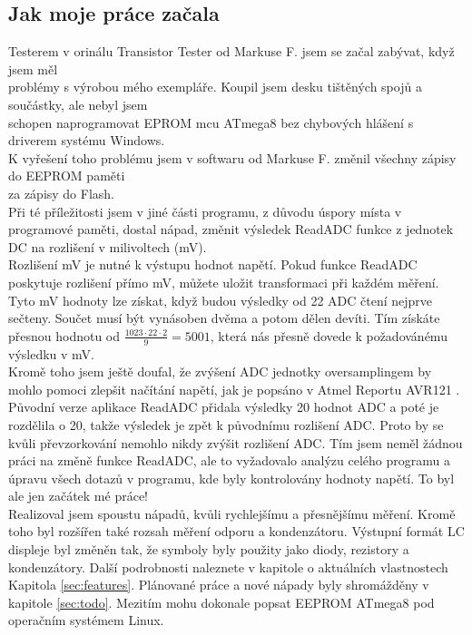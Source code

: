 \subsection*{Jak moje práce začala}
Testerem v orinálu Transistor Tester od Markuse F. \cite{Frejek} jsem se začal zabývat, když jsem měl
\\problémy s výrobou mého exempláře. Koupil jsem desku tištěných spojů a součástky, ale nebyl jsem
\\schopen naprogramovat EPROM mcu ATmega8 bez chybových hlášení s driverem systému Windows.
\\K vyřešení toho problému jsem v softwaru od Markuse F. změnil všechny zápisy do EEPROM paměti
\\za zápisy do Flash.
\\Při té příležitosti jsem v jiné části programu, z důvodu úspory místa v programové paměti, dostal nápad, změnit výsledek ReadADC funkce z jednotek DC  na rozlišení v milivoltech (mV).
\\Rozlišení mV je nutné k výstupu hodnot napětí. Pokud funkce ReadADC poskytuje rozlišení přímo mV, můžete uložit transformaci při každém měření.
Tyto mV hodnoty lze získat, když budou výsledky od 22 ADC čtení nejprve sečteny.
Součet musí být vynásoben dvěma a potom dělen devíti.
Tím získáte přesnou hodnotu od \begin{math}\frac{1023\cdot22\cdot2}{9} = 5001\end{math},
která nás přesně dovede k požadovánému výsledku v mV.\\
Kromě toho jsem ještě doufal, že zvýšení ADC jednotky oversamplingem by mohlo
pomoci zlepšit načítání napětí, jak je popsáno v Atmel Reportu AVR121 \cite{AVR121}.
Původní verze aplikace ReadADC přidala výsledky 20 hodnot ADC a poté je rozdělila o 20,
takže výsledek je zpět k původnímu rozlišení ADC. Proto by se kvůli převzorkování
nemohlo nikdy zvýšit rozlišení ADC.
Tím jsem neměl žádnou práci na změně funkce ReadADC, ale to vyžadovalo analýzu celého programu
a úpravu všech  dotazů v programu, kde byly kontrolovány hodnoty napětí.
To byl ale jen začátek mé práce!\\
Realizoval jsem spoustu nápadů, kvůli rychlejšímu a přesnějšímu měření. Kromě toho byl rozšířen také rozsah měření odporu a kondenzátoru. Výstupní formát LC displeje byl změněn tak, že symboly byly použity jako diody, rezistory a kondenzátory. Další podrobnosti naleznete v kapitole o aktuálních vlastnostech Kapitola \ref{sec:features}. 
Plánované práce a nové nápady byly shromážděny v kapitole \ref{sec:todo}.
Mezitím mohu dokonale popsat EEPROM ATmega8 pod operačním systémem Linux.

